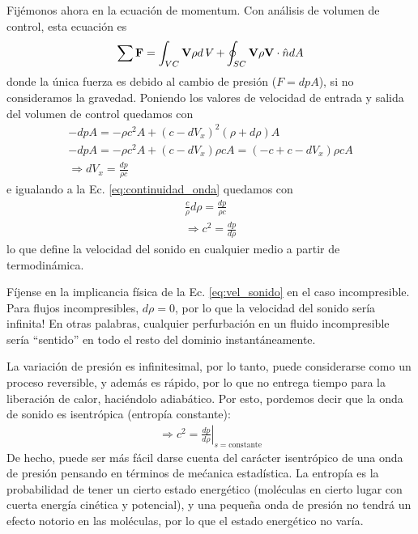 Fijémonos ahora en la ecuación de momentum. 
Con análisis de volumen de control, esta ecuación es
%
\begin{equation}
\sum \mathbf{F} = \int_{VC}\mathbf{V}\rho d\vol + \oint_{SC}\mathbf{V}\rho \mathbf{V}\cdot\hat{n}dA
\end{equation}
%
donde la única fuerza es debido al cambio de presión ($F=dpA$), si no consideramos la gravedad.
Poniendo los valores de velocidad de entrada y salida del volumen de control quedamos con
%
\begin{align}\label{eq:momentum_onda}
-dpA = -\rho c^2A + (c-dV_x)^2(\rho+d\rho)A\nonumber\\
-dpA = -\rho c^2A + (c-dV_x)\rho cA = (-c+c-dV_x)\rho cA\nonumber\\
\Rightarrow dV_x = \frac{dp}{\rho c}
\end{align}
%
e igualando a la Ec. \eqref{eq:continuidad_onda} quedamos con
%
\begin{align}\label{eq:vel_sonido}
\frac{c}{\rho}d\rho = \frac{dp}{\rho c}\nonumber\\
\Rightarrow c^2 = \frac{dp}{d\rho}
\end{align}
%
lo que define la velocidad del sonido en cualquier medio a partir de termodinámica.

Fíjense en la implicancia física de la Ec. \eqref{eq:vel_sonido} en el caso incompresible.
Para flujos incompresibles, $d\rho=0$, por lo que la velocidad del sonido sería infinita!
En otras palabras, cualquier perfurbación en un fluido incompresible sería ``sentido'' en todo el resto del dominio instantáneamente.

La variación de presión es infinitesimal, por lo tanto, puede considerarse como un proceso reversible, y además es rápido, por lo que no entrega tiempo para la liberación de calor, haciéndolo adiabático.
Por esto, pordemos decir que la onda de sonido es isentrópica (entropía constante):
%
\begin{align}\label{eq:vel_sonido}
\Rightarrow c^2 = \left.\frac{dp}{d\rho}\right|_{s=\text{constante}}
\end{align}
%
De hecho, puede ser más fácil darse cuenta del carácter isentrópico de una onda de presión pensando en términos de mećanica estadística.
La entropía es la probabilidad de tener un cierto estado energético (moléculas en cierto lugar con cuerta energía cinética y potencial), y una pequeña onda de presión no tendrá un efecto notorio en las moléculas, por lo que el estado energético no varía.

